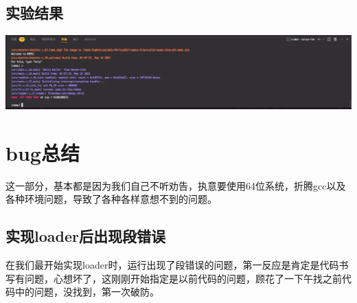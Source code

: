 \documentclass[UTF8,a4paper,10pt]{ctexart}
\begin{document}
\subsection{实验结果}
\begin{center}
  \includegraphics*[scale = 0.25]{pic/hah}
\end{center}





































































\section{bug总结}
这一部分，基本都是因为我们自己不听劝告，执意要使用64位系统，折腾gcc以及各种环境问题，导致了各种各样意想不到的问题。
\subsection{实现loader后出现段错误}
在我们最开始实现loader时，运行出现了段错误的问题，第一反应是肯定是代码书写有问题，心想坏了，这刚刚开始指定是以前代码的问题，顾花了一下午找之前代码中的问题，没找到，第一次破防。
\end{document}
